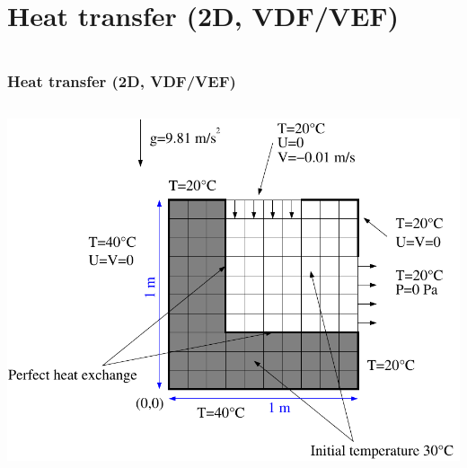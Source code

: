 \documentclass[10pt, hyperref={unicode=true,pdfusetitle, bookmarks=true,bookmarksnumbered=false,bookmarksopen=false, breaklinks=false,pdfborder={0 0 1},backref=true,colorlinks=true,linkcolor=darkblue,pageanchor}]{beamer}
\begin{document}
\section{{\bf{Heat transfer (2D, VDF/VEF)}}}
\begin{frame}
\begin{columns}[c] 
\tableofcontents[sections={1-9},currentsection, currentsubsection]
\tableofcontents[sections={10-16},currentsection, currentsubsection]
\end{columns}
\end{frame}
\begin{frame}
\frametitle{Heat transfer (2D, VDF/VEF)}
\begin{block}{}


\begin{columns}[c] 
\begin{center}
\includegraphics[width=1.\textwidth]{PICTURES/heat_exchange.pdf}
\end{center}


\end{columns}
\end{block}
\end{frame}
\end{document}
